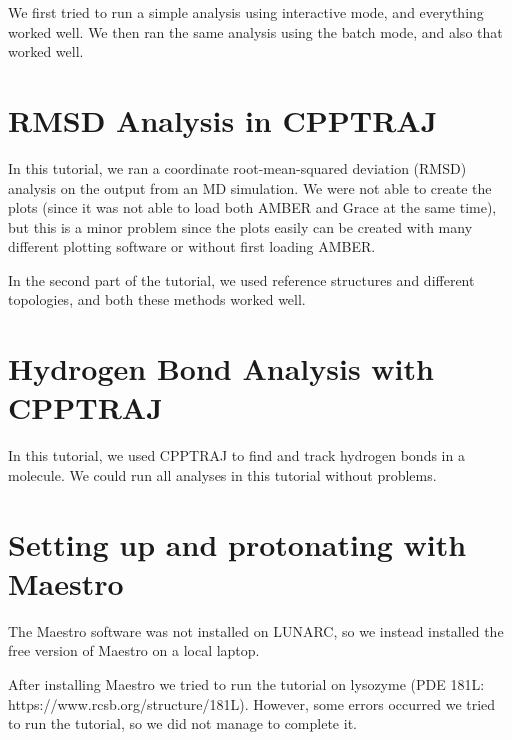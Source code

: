 \documentclass[11pt]{article}
\begin{document}
We first tried to run a simple analysis using interactive mode, and
everything worked well. We then ran the same analysis using the batch
mode, and also that worked well.

\section{RMSD Analysis in CPPTRAJ}\label{rmsd-analysis-in-cpptraj}

In this tutorial, we ran a coordinate root-mean-squared deviation (RMSD)
analysis on the output from an MD simulation. We were not able to create
the plots (since it was not able to load both AMBER and Grace at the
same time), but this is a minor problem since the plots easily can be
created with many different plotting software or without first loading
AMBER.

In the second part of the tutorial, we used reference structures and
different topologies, and both these methods worked well.

\section{Hydrogen Bond Analysis with
CPPTRAJ}\label{hydrogen-bond-analysis-with-cpptraj}

In this tutorial, we used CPPTRAJ to find and track hydrogen bonds in a
molecule. We could run all analyses in this tutorial without problems.

    \section{Setting up and protonating with
Maestro}\label{setting-up-and-protonating-with-maestro}

The Maestro software was not installed on LUNARC, so we instead
installed the free version of Maestro on a local laptop.

After installing Maestro we tried to run the tutorial on lysozyme (PDE
181L: https://www.rcsb.org/structure/181L). However, some errors
occurred we tried to run the tutorial, so we did not manage to complete
it.


    
    
    
    
\end{document}
